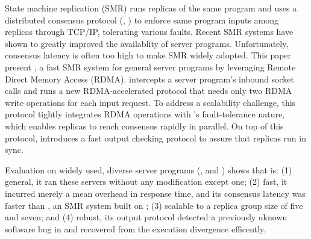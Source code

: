 

State machine replication (SMR) runs replicas of the same program and 
uses a distributed consensus protocol (\eg, \paxos) to enforce same program 
inputs among replicas through TCP/IP, tolerating various faults. Recent SMR 
systems have shown to greatly improved the availablity of server programs. 
Unfortunately, consensus latency is often too high to make SMR widely adopted. 
This paper present \xxx, a fast SMR system for general server programs by 
leveraging Remote Direct Memory Access (RDMA). \xxx intercepts a server 
program's inbound socket calls and runs a new RDMA-accelerated \paxos protocol 
that needs only two RDMA write operations for each input request. To address a 
scalability challenge, this protocol tightly integrates RDMA operations with 
\paxos's fault-tolerance nature, which enables replicas to reach consensus 
rapidly in parallel. On top of this protocol, \xxx introduces a fast output 
checking protocol to assure that replicas run in sync.


Evaluation on \nprog widely used, diverse server programs (\eg, \memcached and 
\mysql) shows that \xxx is: (1) general, it ran these servers without any 
modification except one; (2) fast, it incurred merely a \latencyoverhead mean 
overhead in response time, and its consensus latency was \fasterthanzookeeper 
faster than \calvin, an SMR system built on \zookeeper; (3) scalable to a 
replica group size of five and seven; and (4) robust, its output protocol 
detected a previously uknown software bug in \ssdb and recovered from the 
execution divergence efficently.

